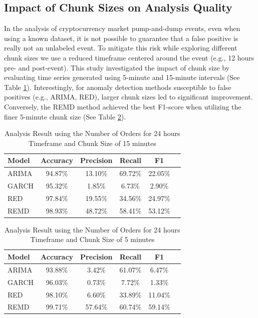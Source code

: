 \documentclass[12pt]{article}
\begin{document}
	\subsection{Impact of Chunk Sizes on Analysis Quality}
	\label{subsec_result_time_interval}

	In the analysis of cryptocurrency market pump-and-dump events, even when using a known dataset, it is not possible to guarantee that a false positive is really not an unlabeled event.
	To mitigate this risk while exploring different chunk sizes we use a reduced timeframe centered around the event (e.g., 12 hours pre- and post-event). 
	This study investigated the impact of chunk size by evaluating time series generated using 5-minute and 15-minute intervals (See Table \ref{tab_full_series_900_orders}).
	Interestingly, for anomaly detection methods susceptible to false positives (e.g., ARIMA, RED), larger chunk sizes led to significant improvement. Conversely, the REMD method achieved the best F1-score when utilizing the finer 5-minute chunk size (See Table \ref{tab_full_series_300_orders}).

	\begin{table}[!ht]
        \centering
        \caption{Analysis Result using the Number of Orders for 24 hours Timeframe and Chunk Size of 15 minutes}
        \begin{tabular}{lccccc}
            \toprule
            \textbf{Model} & \textbf{Accuracy} & \textbf{Precision} & \textbf{Recall} & \textbf{F1} \\
            \midrule
            ARIMA & 94.87\% & 13.10\% & 69.72\% & 22.05\% \\
			GARCH & 95.32\% & 1.85\% & 6.73\% & 2.90\% \\
			RED & 97.84\% & 19.55\% & 34.56\% & 24.97\% \\
			REMD & 98.93\% & 48.72\% & 58.41\% & 53.12\% \\
            \bottomrule
        \end{tabular}
        \label{tab_full_series_900_orders}
    \end{table}

	\begin{table}[!ht]
        \centering
        \caption{Analysis Result using the Number of Orders for 24 hours Timeframe and Chunk Size of 5 minutes}
        \begin{tabular}{lccccc}
            \toprule
            \textbf{Model} & \textbf{Accuracy} & \textbf{Precision} & \textbf{Recall} & \textbf{F1} \\
            \midrule
            ARIMA & 93.88\% & 3.42\% & 61.07\% & 6.47\% \\
			GARCH & 96.03\% & 0.73\% & 7.72\% & 1.33\% \\
			RED & 98.10\% & 6.60\% & 33.89\% & 11.04\% \\
			REMD & 99.71\% & 57.64\% & 60.74\% & 59.14\% \\
            \bottomrule
        \end{tabular}
        \label{tab_full_series_300_orders}
    \end{table}
\end{document}
